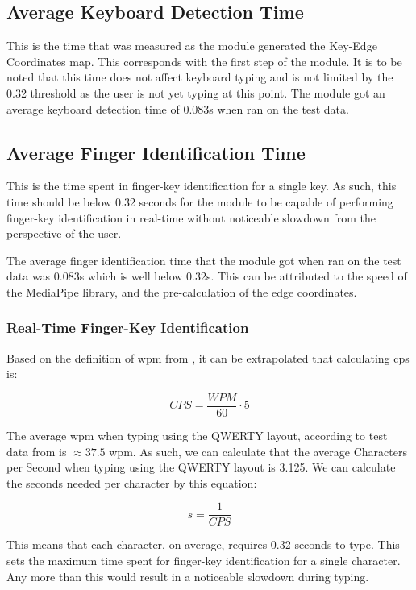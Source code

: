 \documentclass[preprint,12pt,authoryear]{elsarticle}
\begin{document}
\subsection{Average Keyboard Detection Time}
This is the time that was measured as the module generated the Key-Edge
Coordinates map. This corresponds with the first step of the module. It is to be
noted that this time does not affect keyboard typing and is not limited by the
0.32 threshold as the user is not yet typing at this point. The module got an
average keyboard detection time of 0.083s when ran on the test data.

\subsection{Average Finger Identification Time}
This is the time spent in finger-key identification for a single key. As such,
this time should be below 0.32 seconds for the module to be capable of
performing finger-key identification in real-time without noticeable slowdown
from the perspective of the user.

The average finger identification time that the module got when ran on the test
data was 0.083s which is well below 0.32s. This can be attributed to the speed
of the MediaPipe library, and the pre-calculation of the edge coordinates.

\subsubsection{Real-Time Finger-Key Identification}
Based on the definition of \ac{wpm} from \citet{arif2009}, it can be
extrapolated that calculating \ac{cps} is:

\begin{equation}
	CPS = \frac{WPM}{60} \cdot 5
	\label{eq:cps}
\end{equation}

The average \ac{wpm} when typing using the QWERTY layout, according to test data
from \citet{keybr} is $\approx37.5$ \ac{wpm}. As such, we can calculate
that the average Characters per Second when typing using the QWERTY layout is
3.125. We can calculate the seconds needed per character by this equation:

\begin{equation}
	s = \frac{1}{CPS}
	\label{eq:s}
\end{equation}

This means that each character, on average, requires 0.32 seconds to type. This
sets the maximum time spent for finger-key identification for a single
character. Any more than this would result in a noticeable slowdown during
typing.
\end{document}
